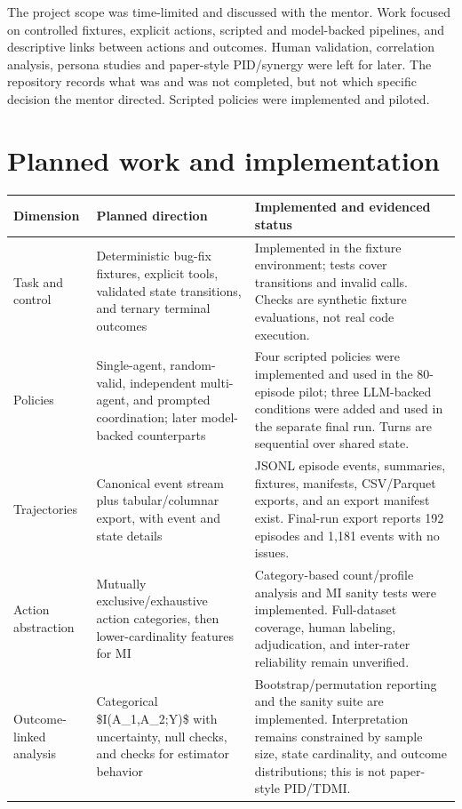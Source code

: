 \documentclass[12pt,a4paper,oneside]{report}
\begin{document}
The project scope was time-limited and discussed with the mentor. Work focused on controlled fixtures, explicit actions, scripted and model-backed pipelines, and descriptive links between actions and outcomes. Human validation, correlation analysis, persona studies and paper-style PID/synergy were left for later. The repository records what was and was not completed, but not which specific decision the mentor directed. Scripted policies were implemented and piloted.

\section{Planned work and implementation}
\begin{table}[htbp]
\centering
\small
\setlength{\tabcolsep}{4pt}
\begin{tabularx}{\linewidth}{|Y|Y|Y|}
\hline
\textbf{Dimension} & \textbf{Planned direction} & \textbf{Implemented and evidenced status} \\
\hline
Task and control & Deterministic bug-fix fixtures, explicit tools, validated state transitions, and ternary terminal outcomes & Implemented in the fixture environment; tests cover transitions and invalid calls. Checks are synthetic fixture evaluations, not real code execution. \\
\hline
Policies & Single-agent, random-valid, independent multi-agent, and prompted coordination; later model-backed counterparts & Four scripted policies were implemented and used in the 80-episode pilot; three LLM-backed conditions were added and used in the separate final run. Turns are sequential over shared state. \\
\hline
Trajectories & Canonical event stream plus tabular/columnar export, with event and state details & JSONL episode events, summaries, fixtures, manifests, CSV/Parquet exports, and an export manifest exist. Final-run export reports 192 episodes and 1,181 events with no issues. \\
\hline
Action abstraction & Mutually exclusive/exhaustive action categories, then lower-cardinality features for MI & Category-based count/profile analysis and MI sanity tests were implemented. Full-dataset coverage, human labeling, adjudication, and inter-rater reliability remain unverified. \\
\hline
Outcome-linked analysis & Categorical \$I(A\allowbreak\_1,A\allowbreak\_2;Y)\$ with uncertainty, null checks, and checks for estimator behavior & Bootstrap/permutation reporting and the sanity suite are implemented. Interpretation remains constrained by sample size, state cardinality, and outcome distributions; this is not paper-style PID/TDMI. \\

\end{tabularx}
\end{table}
\end{document}
